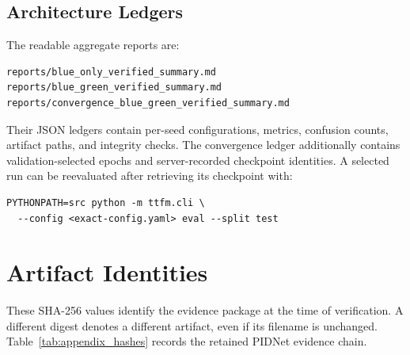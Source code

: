 \section{Architecture Ledgers}

The readable aggregate reports are:
\begin{lstlisting}
reports/blue_only_verified_summary.md
reports/blue_green_verified_summary.md
reports/convergence_blue_green_verified_summary.md
\end{lstlisting}
Their JSON ledgers contain per-seed configurations, metrics, confusion counts,
artifact paths, and integrity checks. The convergence ledger additionally
contains validation-selected epochs and server-recorded checkpoint identities.
A selected run can be reevaluated after retrieving its checkpoint with:
\begin{lstlisting}
PYTHONPATH=src python -m ttfm.cli \
  --config <exact-config.yaml> eval --split test
\end{lstlisting}

\chapter{Artifact Identities}
\label{app:hashes}

These SHA-256 values identify the evidence package at the time of verification.
A different digest denotes a different artifact, even if its filename is
unchanged.
Table~\ref{tab:appendix_hashes} records the retained PIDNet evidence chain.

